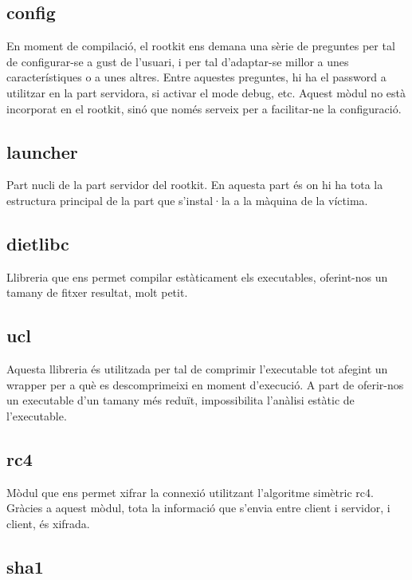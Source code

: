 \subsection{config}

En moment de compilació, el rootkit ens demana una sèrie de preguntes per tal de configurar-se a gust
de l'usuari, i per tal d'adaptar-se millor a unes característiques o a unes altres. Entre aquestes
preguntes, hi ha el password a utilitzar en la part servidora, si activar el mode debug, etc. Aquest
mòdul no està incorporat en el rootkit, sinó que només serveix per a facilitar-ne la configuració.

\subsection{launcher}

Part nucli de la part servidor del rootkit. En aquesta part és on hi ha tota la estructura principal
de la part que s'instal·la a la màquina de la víctima.

\subsection{dietlibc}

Llibreria que ens permet compilar estàticament els executables, oferint-nos un tamany de fitxer
resultat, molt petit.

\subsection{ucl}

Aquesta llibreria és utilitzada per tal de comprimir l'executable tot afegint un wrapper per a què 
es descomprimeixi en moment d'execució. A part de oferir-nos un executable d'un tamany més reduït,
impossibilita l'anàlisi estàtic de l'executable.

\subsection{rc4}

Mòdul que ens permet xifrar la connexió utilitzant l'algoritme simètric rc4. Gràcies a aquest mòdul,
tota la informació que s'envia entre client i servidor, i client, és xifrada. 

\subsection{sha1}

